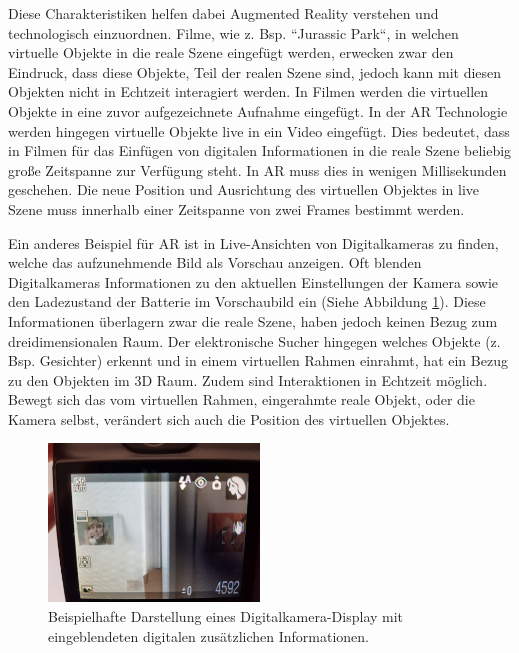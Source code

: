 Diese Charakteristiken helfen dabei Augmented Reality verstehen und technologisch einzuordnen. \cite{Azuma.1997} Filme, wie z. Bsp. ``Jurassic Park``, in welchen virtuelle Objekte in die reale Szene eingefügt werden, 
erwecken zwar den Eindruck, dass diese Objekte, Teil der realen Szene sind, jedoch kann mit diesen Objekten nicht in Echtzeit interagiert werden. \cite{Tonnis2010} In Filmen werden die virtuellen Objekte in eine zuvor aufgezeichnete Aufnahme eingefügt. 
In der AR Technologie werden hingegen virtuelle Objekte live in ein Video eingefügt. Dies bedeutet, dass in  Filmen für das Einfügen von digitalen Informationen in die reale Szene beliebig große Zeitspanne zur Verfügung steht. 
In AR muss dies in wenigen Millisekunden geschehen. Die neue Position und Ausrichtung des virtuellen Objektes in live Szene muss innerhalb einer Zeitspanne von zwei Frames bestimmt werden.

Ein anderes Beispiel für AR ist in Live-Ansichten von Digitalkameras zu finden, welche das aufzunehmende Bild als Vorschau anzeigen. Oft blenden Digitalkameras Informationen zu den aktuellen Einstellungen der Kamera sowie den 
Ladezustand der Batterie im Vorschaubild ein (Siehe Abbildung \ref{img:ar_camera_example}). Diese Informationen überlagern zwar die reale Szene, haben jedoch keinen Bezug zum dreidimensionalen Raum. 
Der elektronische Sucher hingegen welches Objekte (z. Bsp. Gesichter) erkennt und in einem virtuellen Rahmen einrahmt, hat ein Bezug zu den Objekten im 3D Raum. 
Zudem sind Interaktionen in Echtzeit möglich. Bewegt sich das vom virtuellen Rahmen, eingerahmte reale Objekt, oder die Kamera selbst, verändert sich auch die Position des virtuellen Objektes. 

\begin{figure}
	\centering
	\includegraphics[width=0.50\textwidth]{resources/fundamentals/example_camera_screen_ar}
	\caption{Beispielhafte Darstellung eines Digitalkamera-Display mit eingeblendeten digitalen zusätzlichen Informationen.\cite{Beispiel Dititalkamera}}
	\label{img:ar_camera_example}
\end{figure}

